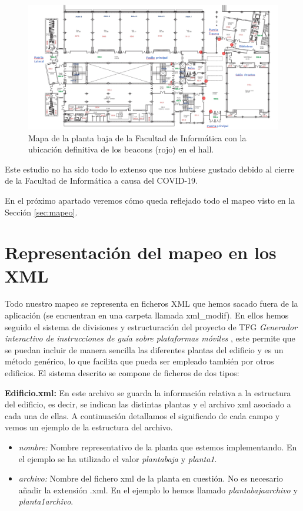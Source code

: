 \begin{figure}[t]
	\centering
	\includegraphics[width=1\textwidth]{Imagenes/Descripciondeltrabajo/beacons_plantabaja_final}
	\caption{Mapa de la planta baja de la Facultad de Informática con la ubicación definitiva de los beacons (rojo) en el hall. }
	\label{fig:beaconsPBaja}
\end{figure}

Este estudio no ha sido todo lo extenso que nos hubiese gustado debido al cierre de la Facultad de Informática a causa del COVID-19.

En el próximo apartado veremos cómo queda reflejado todo el mapeo visto en la Sección \ref{sec:mapeo}.

\section{Representación del mapeo en los XML}
\label{sub:mapeo_xml}
Todo nuestro mapeo se representa en ficheros XML que hemos sacado fuera de la aplicación (se encuentran en una carpeta llamada xml\_modif). En ellos hemos seguido el sistema de divisiones y estructuración del proyecto de TFG \textit{Generador interactivo de instrucciones de guía sobre plataformas móviles} \citep{TFGguia}, este permite que se puedan incluir
de manera sencilla las diferentes plantas del edificio y es un método genérico, lo que facilita que pueda ser empleado también por otros edificios. El sistema descrito se compone de ficheros de dos tipos:

\textbf{Edificio.xml:} En este archivo se guarda la información relativa a la estructura del edificio, es decir, se indican las distintas plantas y el archivo xml asociado a cada una de ellas. A continuación detallamos el significado de cada campo y vemos un ejemplo de la estructura del archivo.

\begin{itemize}
	\item \textit{nombre:} Nombre representativo de la planta que estemos implementando. En el ejemplo se ha utilizado el valor \textit{plantabaja} y \textit{planta1}.
	
	\item \textit{archivo:} Nombre del fichero xml de la planta en cuestión. No es necesario añadir la extensión .xml. En el ejemplo lo hemos llamado \textit{plantabajaarchivo} y \textit{planta1archivo}.
\end{itemize}


